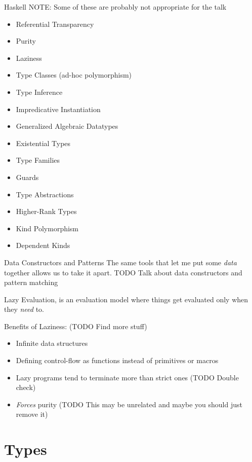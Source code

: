 \documentclass[pdf]{beamer}
\begin{document}
\begin{frame}{Haskell}
  NOTE: Some of these are probably not appropriate for the talk
  \begin{itemize}
  \item Referential Transparency
  \item Purity
  \item Laziness
  \item Type Classes (ad-hoc polymorphism)
  \item Type Inference
  \item Impredicative Instantiation
  \item Generalized Algebraic Datatypes
  \item Existential Types
  \item Type Families
  \item Guards
  \item Type Abstractions
  \item Higher-Rank Types
  \item Kind Polymorphism
  \item Dependent Kinds
  \end{itemize}

\end{frame}

\begin{frame}{Data Constructors and Patterns}
  The same tools that let me put some \textit{data} together allows us to take it apart.
  TODO Talk about data constructors and pattern matching
\end{frame}

\begin{frame}
  Lazy Evaluation, is an evaluation model where things get evaluated only when they \textit{need} to.

  Benefits of Laziness: (TODO Find more stuff)
  \begin{itemize}
  \item Infinite data structures
  \item Defining control-flow as functions instead of primitives or macros
  \item Lazy programs tend to terminate more than strict ones (TODO Double check)
  \item \textit{Forces} purity (TODO This may be unrelated and maybe you should just remove it)
  \end{itemize}
\end{frame}

\section{Types}
\label{sec:types}
\end{document}

